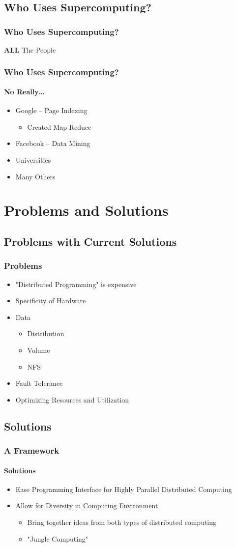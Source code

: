 \documentclass{beamer}
\begin{document}
\subsection{Who Uses Supercomputing?}
\begin{frame}
\frametitle{Who Uses Supercomputing?}
\textbf{ALL} The People
\end{frame}
\begin{frame}
\frametitle{Who Uses Supercomputing?}
\framesubtitle{No Really\dots{}}
\begin{itemize}
\item{Google -- Page Indexing}
\begin{itemize}
\item{Created Map-Reduce}
\end{itemize}
\item{Facebook -- Data Mining}
\item{Universities}
\item{Many Others}
\end{itemize}
\end{frame}
\section{Problems and Solutions}
\subsection{Problems with Current Solutions}
\begin{frame}
\frametitle{Problems}
\begin{itemize}
\item{"Distributed Programming" is expensive}
\item{Specificity of Hardware}
\item{Data}
\begin{itemize}
\item{Distribution}
\item{Volume}
\item{NFS}
\end{itemize}
\item{Fault Tolerance}
\item{Optimizing Resources and Utilization}
\end{itemize}
\end{frame}
\subsection{Solutions}
\begin{frame}
\frametitle{A Framework}
\framesubtitle{Solutions}
\begin{itemize}
\item{Ease Programming Interface for Highly Parallel Distributed Computing}
\item{Allow for Diversity in Computing Environment}
\begin{itemize}
\item{Bring together ideas from both types of distributed computing}
\item{"Jungle Computing"}
\end{itemize}
\end{itemize}
\end{frame}
\end{document}
